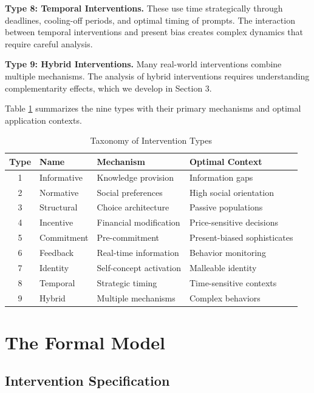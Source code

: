 \documentclass[12pt,a4paper]{article}
\begin{document}
\textbf{Type 8: Temporal Interventions.} These use time strategically through deadlines, cooling-off periods, and optimal timing of prompts. The interaction between temporal interventions and present bias creates complex dynamics that require careful analysis.

\textbf{Type 9: Hybrid Interventions.} Many real-world interventions combine multiple mechanisms. The analysis of hybrid interventions requires understanding complementarity effects, which we develop in Section 3.

Table \ref{tab:types} summarizes the nine types with their primary mechanisms and optimal application contexts.

\begin{table}[H]
\centering
\caption{Taxonomy of Intervention Types}
\label{tab:types}
\small
\renewcommand{\arraystretch}{1.2}
\begin{tabular}{@{}clll@{}}
\toprule
\textbf{Type} & \textbf{Name} & \textbf{Mechanism} & \textbf{Optimal Context} \\
\midrule
1 & Informative & Knowledge provision & Information gaps \\
2 & Normative & Social preferences & High social orientation \\
3 & Structural & Choice architecture & Passive populations \\
4 & Incentive & Financial modification & Price-sensitive decisions \\
5 & Commitment & Pre-commitment & Present-biased sophisticates \\
6 & Feedback & Real-time information & Behavior monitoring \\
7 & Identity & Self-concept activation & Malleable identity \\
8 & Temporal & Strategic timing & Time-sensitive contexts \\
9 & Hybrid & Multiple mechanisms & Complex behaviors \\
\bottomrule
\end{tabular}
\end{table}


\section{The Formal Model}

\subsection{Intervention Specification}
\end{document}
